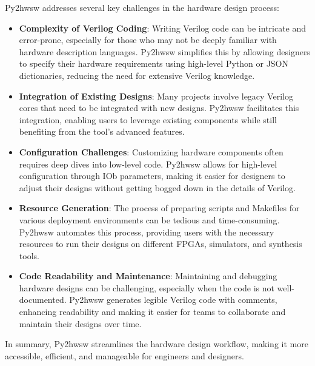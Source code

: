 %

Py2hwsw addresses several key challenges in the hardware design process:
\begin{itemize}
    \item \textbf{Complexity of Verilog Coding}: Writing Verilog code can be intricate and error-prone, especially for those who may not be deeply familiar with hardware description languages. Py2hwsw simplifies this by allowing designers to specify their hardware requirements using high-level Python or JSON dictionaries, reducing the need for extensive Verilog knowledge.

    \item \textbf{Integration of Existing Designs}: Many projects involve legacy Verilog cores that need to be integrated with new designs. Py2hwsw facilitates this integration, enabling users to leverage existing components while still benefiting from the tool's advanced features.

    \item \textbf{Configuration Challenges}: Customizing hardware components often requires deep dives into low-level code. Py2hwsw allows for high-level configuration through IOb parameters, making it easier for designers to adjust their designs without getting bogged down in the details of Verilog.

    \item \textbf{Resource Generation}: The process of preparing scripts and Makefiles for various deployment environments can be tedious and time-consuming. Py2hwsw automates this process, providing users with the necessary resources to run their designs on different FPGAs, simulators, and synthesis tools.

    \item \textbf{Code Readability and Maintenance}: Maintaining and debugging hardware designs can be challenging, especially when the code is not well-documented. Py2hwsw generates legible Verilog code with comments, enhancing readability and making it easier for teams to collaborate and maintain their designs over time.
\end{itemize}

In summary, Py2hwsw streamlines the hardware design workflow, making it more accessible, efficient, and manageable for engineers and designers.
